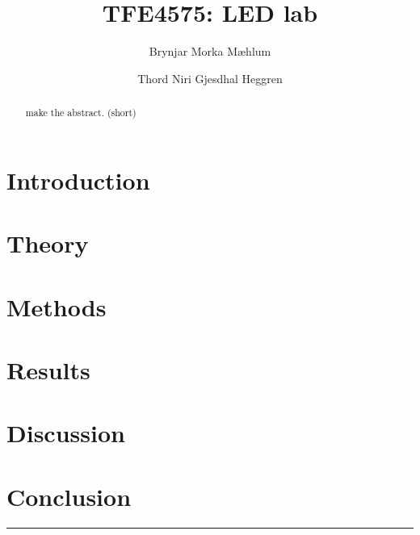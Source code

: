 \documentclass[5p,sort&compress]{elsarticle}
\begin{document}
\begin{frontmatter}

  \title{TFE4575: LED lab}

  \author[fysikk]{Brynjar Morka Mæhlum}
  \author[fysikk]{Thord Niri Gjesdhal Heggren}
  \address[fysikk]{Department of Physics, Norwegian University of Science and Technology, 7491 Trondheim, Norway.}

  \begin{abstract}

    \noindent make the abstract. (short)

  \end{abstract}


\end{frontmatter}

{ %
\hypersetup{linkcolor=purple}

\tableofcontents


\section{Introduction}
\label{intro}



\section{Theory}
\label{theory}



\section{Methods}
\label{methods}




\section{Results}
\label{results}


\section{Discussion}
\label{discussion}



\section{Conclusion}
\label{conclusion}

}
\begingroup
\begin{center}
  \rule{2cm}{.4pt}
\end{center}
\makeatletter
{}
\makeatother



\endgroup
\end{document}
